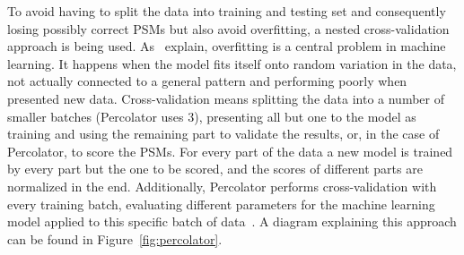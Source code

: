 	To avoid having to split the data into training and testing set and consequently losing possibly correct PSMs but also avoid overfitting, a nested cross-validation approach is being used. As~\citet{Granholm2012} explain, overfitting is a central problem in machine learning. It happens when the model fits itself onto random variation in the data, not actually connected to a general pattern and performing poorly when presented new data. Cross-validation means splitting the data into a number of smaller batches (Percolator uses $3$), presenting all but one to the model as training and using the remaining part to validate the results, or, in the case of Percolator, to score the PSMs. For every part of the data a new model is trained by every part but the one to be scored, and the scores of different parts are normalized in the end. Additionally, Percolator performs cross-validation with every training batch, evaluating different parameters for the machine learning model applied to this specific batch of data~\cite{Granholm2012}. A diagram explaining this approach can be found in Figure~\ref{fig:percolator}.\\
